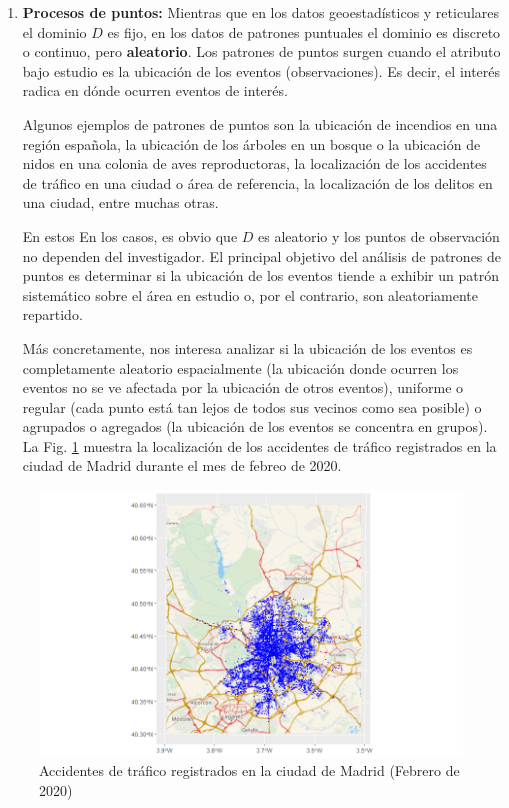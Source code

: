 \documentclass[
]{report}
\theoremstyle{definition}
\theoremstyle{definition}
\theoremstyle{definition}
\theoremstyle{definition}
\theoremstyle{remark}
\begin{document}
\begin{enumerate}
\def\labelenumi{\arabic{enumi}.}
\setcounter{enumi}{2}
\item
  \textbf{Procesos de puntos:} Mientras que en los datos geoestadísticos y
  reticulares el dominio \(D\) es fijo, en los datos de patrones puntuales el
  dominio es discreto o continuo, pero \textbf{aleatorio}. Los patrones de puntos
  surgen cuando el atributo bajo estudio es la ubicación de los eventos
  (observaciones). Es decir, el interés radica en dónde ocurren eventos de
  interés.

  Algunos ejemplos de patrones de puntos son la ubicación de incendios en una
  región española, la ubicación de los árboles en un bosque o la ubicación de
  nidos en una colonia de aves reproductoras, la localización de los
  accidentes de tráfico en una ciudad o área de referencia, la localización de
  los delitos en una ciudad, entre muchas otras.

  En estos En los casos, es obvio que \(D\) es aleatorio y los puntos de
  observación no dependen del investigador. El principal objetivo del análisis
  de patrones de puntos es determinar si la ubicación de los eventos tiende a
  exhibir un patrón sistemático sobre el área en estudio o, por el contrario,
  son aleatoriamente repartido.

  Más concretamente, nos interesa analizar si la ubicación de los eventos es
  completamente aleatorio espacialmente (la ubicación donde ocurren los
  eventos no se ve afectada por la ubicación de otros eventos), uniforme o
  regular (cada punto está tan lejos de todos sus vecinos como sea posible) o
  agrupados o agregados (la ubicación de los eventos se concentra en grupos).
  La Fig. \ref{fig:ejem-pp} muestra la localización de los accidentes de
  tráfico registrados en la ciudad de Madrid durante el mes de febreo de 2020.
\end{enumerate}

\begin{figure}

{\centering \includegraphics[width=0.6\linewidth]{img/traf_madrid_feb_2020} 

}

\caption{Accidentes de tráfico registrados en la ciudad de Madrid (Febrero de 2020)}\label{fig:ejem-pp}
\end{figure}
\end{document}
